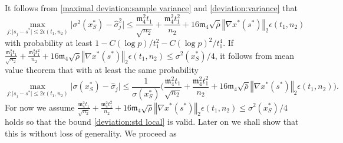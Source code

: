 \documentclass[mnsc,blindrev]{informs4} %
\newcommand{\norm}[1]{\left \Vert #1 \right\Vert}
\begin{document}
It follows from \eqref{maximal deviation:sample variance} and \eqref{deviation:variance} that
\begin{equation*}
    \max_{j:\lvert s_j-s^*\rvert\leq 2\epsilon(t_1,n_2)}\lvert \sigma^2(x^*_S)-\hat \sigma^2_j\rvert\leq \frac{\mathfrak{m}_4^2t_1}{\sqrt{n_2}}+\frac{\mathfrak{m}_4^2t_1^2}{n_2}+16\mathfrak{m}_4 \sqrt{\bar{\rho}}\norm{\nabla x^*(s^*)}_2\epsilon(t_1,n_2)
\end{equation*}
with probability at least $1-C(\log p)/t_1^2-C(\log p)^2/t_1^4$. If $\frac{\mathfrak{m}_4^2t_1}{\sqrt{n_2}}+\frac{\mathfrak{m}_4^2t_1^2}{n_2}+16\mathfrak{m}_4 \sqrt{\bar{\rho}}\norm{\nabla x^*(s^*)}_2\epsilon(t_1,n_2)\leq \sigma^2(x^*_S)/4$, it follows from mean value theorem that with at least the same probability
\begin{equation}\label{deviation:std local}
    \max_{j:\lvert s_j-s^*\rvert\leq 2\epsilon(t_1,n_2)}\lvert \sigma(x^*_S)- \hat \sigma_j\rvert\leq \frac{1}{\sigma(x^*_S)}\big(\frac{\mathfrak{m}_4^2t_1}{\sqrt{n_2}}+\frac{\mathfrak{m}_4^2t_1^2}{n_2}+16\mathfrak{m}_4 \sqrt{\bar{\rho}}\norm{\nabla x^*(s^*)}_2\epsilon(t_1,n_2)\big).
\end{equation}
For now we assume $\frac{\mathfrak{m}_4^2t_1}{\sqrt{n_2}}+\frac{\mathfrak{m}_4^2t_1^2}{n_2}+16\mathfrak{m}_4 \sqrt{\bar{\rho}}\norm{\nabla x^*(s^*)}_2\epsilon(t_1,n_2)\leq \sigma^2(x^*_S)/4$ holds so that the bound \eqref{deviation:std local} is valid. Later on we shall show that this is without loss of generality. We proceed as
\end{document}
